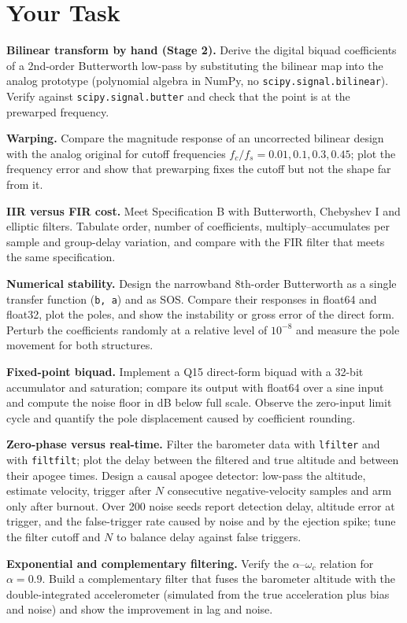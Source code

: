 \documentclass[11pt,a4paper]{article}
\begin{document}
\section*{Your Task}
\begin{tasks}
  \item \textbf{Bilinear transform by hand (Stage 2).} Derive the digital biquad coefficients of a 2nd-order Butterworth low-pass by substituting the bilinear map into the analog prototype (polynomial algebra in NumPy, no \texttt{scipy.signal.bilinear}). Verify against \texttt{scipy.signal.butter} and check that the  point is at the prewarped frequency.
  \item \textbf{Warping.} Compare the magnitude response of an uncorrected bilinear design with the analog original for cutoff frequencies $f_c/f_s=0.01,0.1,0.3,0.45$; plot the frequency error and show that prewarping fixes the cutoff but not the shape far from it.
  \item \textbf{IIR versus FIR cost.} Meet Specification B with Butterworth, Chebyshev I and elliptic filters. Tabulate order, number of coefficients, multiply--accumulates per sample and group-delay variation, and compare with the FIR filter that meets the same specification.
  \item \textbf{Numerical stability.} Design the narrowband 8th-order Butterworth as a single transfer function (\texttt{b, a}) and as SOS. Compare their responses in float64 and float32, plot the poles, and show the instability or gross error of the direct form. Perturb the coefficients randomly at a relative level of $10^{-8}$ and measure the pole movement for both structures.
  \item \textbf{Fixed-point biquad.} Implement a Q15 direct-form biquad with a 32-bit accumulator and saturation; compare its output with float64 over a sine input and compute the noise floor in dB below full scale. Observe the zero-input limit cycle and quantify the pole displacement caused by coefficient rounding.
  \item \textbf{Zero-phase versus real-time.} Filter the barometer data with \texttt{lfilter} and with \texttt{filtfilt}; plot the delay between the filtered and true altitude and between their apogee times. Design a causal apogee detector: low-pass the altitude, estimate velocity, trigger after $N$ consecutive negative-velocity samples and arm only after burnout. Over 200 noise seeds report detection delay, altitude error at trigger, and the false-trigger rate caused by noise and by the ejection spike; tune the filter cutoff and $N$ to balance delay against false triggers.
  \item \textbf{Exponential and complementary filtering.} Verify the $\alpha$--$\omega_c$ relation for $\alpha=0.9$. Build a complementary filter that fuses the barometer altitude with the double-integrated accelerometer (simulated from the true acceleration plus bias and noise) and show the improvement in lag and noise.
\end{tasks}
\end{document}
